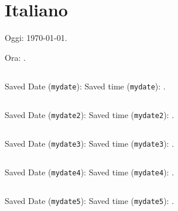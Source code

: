 \documentclass[italian]{article}
\begin{document}
\tableofcontents
  \section{Italiano}

  Oggi: \today.

  Ora: \DTMnow.

  \subsection{}
  Saved Date (\texttt{mydate}): 
  Saved time (\texttt{mydate}): .

  \subsection{}
  Saved Date (\texttt{mydate2}): 
  Saved time (\texttt{mydate2}): .

  \subsection{}
  Saved Date (\texttt{mydate3}): 
  Saved time (\texttt{mydate3}): .

  \subsection{}
  Saved Date (\texttt{mydate4}): 
  Saved time (\texttt{mydate4}): .

  \subsection{}
  Saved Date (\texttt{mydate5}): 
  Saved time (\texttt{mydate5}): .
\end{document}
